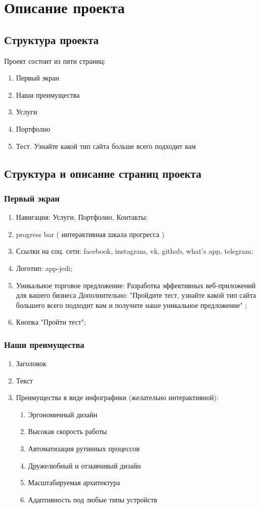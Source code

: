 \section{Описание проекта}
\subsection{Структура проекта}
Проект состоит из пяти страниц:
\begin{enumerate}
  \item Первый экран
  \item Наши преимущества
  \item Услуги
  \item Портфолио
  \item Тест. Узнайте какой тип сайта больше всего подходит вам
\end{enumerate}
\subsection{Структура и описание страниц проекта}

\subsubsection{Первый экран}
\begin{enumerate}
  \item Навигация: Услуги, Портфолио, Контакты;
  \item progress bar ( интерактивная шкала прогресса )
  \item Ссылки на соц. сети: facebook, instagram, vk, github, what's app, telegram;
  \item Логотип: app-jedi;
  \item Уникальное торговое предложение: Разработка эффективных веб-приложений для вашего бизнеса Дополнительно: "Пройдите тест, узнайте какой тип сайта большего всего подходит вам и получите наше уникальное предложение" ;
  \item Кнопка "Пройти тест";
\end{enumerate}

\subsubsection{Наши преимущества}
\begin{enumerate}
  \item Заголовок
  \item Текст
  \item Преимущества в виде инфографики (желательно интерактивной):
  \begin{enumerate}
    \item Эргономичный дизайн
    \item Высокая скорость работы
    \item Автоматизация рутинных процессов
    \item Дружелюбный и отзывчивый дизайн
    \item Масштабируемая архитектура
    \item Адаптивность под любые типы устройств
  \end{enumerate}
\end{enumerate}

